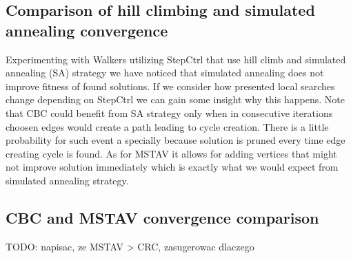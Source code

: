 \subsection{Comparison of hill climbing and simulated annealing convergence}
Experimenting with Walkers utilizing StepCtrl that use hill climb and simulated annealing (SA) strategy we have noticed that simulated annealing does not improve fitness of found solutions.
If we consider how presented local searches change depending on StepCtrl we can gain some insight why this happens.
Note that CBC could benefit from SA strategy only when in consecutive iterations choosen edges would create a path leading to cycle creation. There is a little probability for such event a specially because solution is pruned every time edge creating cycle is found. As for MSTAV it allows for adding vertices that might not improve solution immediately which is exactly what we would expect from simulated annealing strategy.

\begin{figure}[H]

\end{figure}
\begin{figure}[H]

\end{figure}
\begin{figure}[H]

\end{figure}
\begin{figure}[H]

\end{figure}

\begin{figure}[H]

\end{figure}
\begin{figure}[H]

\end{figure}
\begin{figure}[H]

\end{figure}
\begin{figure}[H]

\end{figure}

\subsection{CBC and MSTAV convergence comparison}
TODO: napisac, ze MSTAV > CRC, zasugerowac dlaczego

